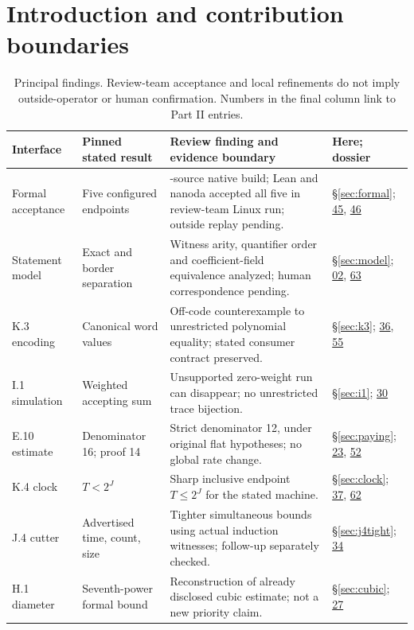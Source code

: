 \documentclass[11pt,letterpaper]{article}
\theoremstyle{definition}\newtheorem{definition}[theorem]{Definition}\newtheorem{example}[theorem]{Example}
\theoremstyle{remark}\newtheorem{remark}[theorem]{Remark}
\newcommand{\doss}[1]{\hyperlink{claim.#1}{#1}}
\begin{document}
\section{Introduction and contribution boundaries}\label{sec:intro}
\begin{table}[H]
\centering\small
\setlength{\tabcolsep}{4pt}
\caption{Principal findings. Review-team acceptance and local refinements do not imply outside-operator or human confirmation. Numbers in the final column link to Part II entries.}\label{tab:findings}
\begin{tabular}{@{}>{\raggedright\arraybackslash}p{.17\linewidth}>{\raggedright\arraybackslash}p{.23\linewidth}>{\raggedright\arraybackslash}p{.39\linewidth}>{\raggedright\arraybackslash}p{.15\linewidth}@{}}\toprule
Interface & Pinned stated result & Review finding and evidence boundary & Here; dossier \\\midrule
Formal acceptance & Five configured endpoints & 324-source native build; Lean and nanoda accepted all five in review-team Linux run; outside replay pending. & \S\ref{sec:formal}; \doss{45}, \doss{46}\\[2pt]
Statement model & Exact and border separation & Witness arity, quantifier order and coefficient-field equivalence analyzed; human correspondence pending. & \S\ref{sec:model}; \doss{02}, \doss{63}\\[2pt]
K.3 encoding & Canonical word values & Off-code counterexample to unrestricted polynomial equality; stated consumer contract preserved. & \S\ref{sec:k3}; \doss{36}, \doss{55}\\[2pt]
I.1 simulation & Weighted accepting sum & Unsupported zero-weight run can disappear; no unrestricted trace bijection. & \S\ref{sec:i1}; \doss{30}\\[2pt]
E.10 estimate & Denominator 16; proof 14 & Strict denominator 12, under original flat hypotheses; no global rate change. & \S\ref{sec:paying}; \doss{23}, \doss{52}\\[2pt]
K.4 clock & $T<2^J$ & Sharp inclusive endpoint $T\le2^J$ for the stated machine. & \S\ref{sec:clock}; \doss{37}, \doss{62}\\[2pt]
J.4 cutter & Advertised time, count, size & Tighter simultaneous bounds using actual induction witnesses; follow-up separately checked. & \S\ref{sec:j4tight}; \doss{34}\\[2pt]
H.1 diameter & Seventh-power formal bound & Reconstruction of already disclosed cubic estimate; not a new priority claim. & \S\ref{sec:cubic}; \doss{27}\\
\bottomrule\end{tabular}
\end{table}
\end{document}
